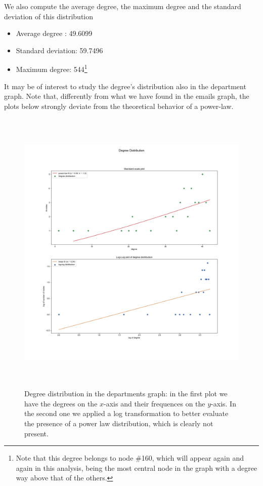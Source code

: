 \documentclass{report}
\theoremstyle{definition}
\theoremstyle{remark}
\begin{document}
We also compute the average degree, the maximum degree and the standard deviation of this distribution
\begin{itemize}
	\item Average degree : 49.6099
	\item Standard deviation: 59.7496
	\item Maximum degree: 544\footnote{Note that this degree belongs to node \#160, which will appear again and again in this analysis, being the most central node in the graph with a degree way above that of the others.}
\end{itemize}
It may be of interest to study the degree's distribution also in the department graph. Note that, differently from what we have found in the emails graph, the plots below strongly deviate from the theoretical behavior of a power-law.
\begin{figure} [H]
	\centering
	\centerline{\includegraphics[width = 18cm, height = 14cm, keepaspectratio]{DEP_degree_distribution.png}}	\caption{Degree distribution in the departments graph: in the first plot we have the degrees on the $x$-axis and their frequences on the $y$-axis. In the second one we applied a log transformation to better evaluate the presence of a power law distribution, which is clearly not present.}
\end{figure}
\newpage
\end{document}
